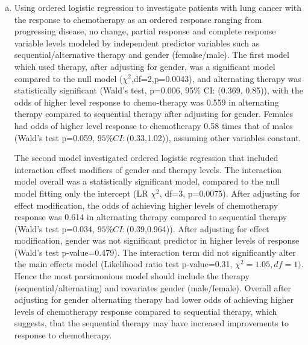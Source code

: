 \documentclass{article}
\begin{document}
\begin{enumerate}[a.]
\item  Using ordered logistic regression to investigate patients with lung cancer  with the response to chemotherapy as an ordered response ranging from progressing disease, no change, partial response and complete response variable levels modeled by independent predictor variables such as sequential/alternative therapy and gender (femalse/male).  The first model which used therapy, after adjusting for gender, was a significant model compared to the null model ($\chi^{2}$,df=2,p=0.0043), and alternating therapy was statistically significant (Wald's test, p=0.006, 95$\%$ CI: (0.369, 0.85)), with the odds of higher level response to chemo-therapy was 0.559 in alternating therapy compared to sequential therapy after adjusting for gender.  Females had odds of higher level response to chemotherapy 0.58 times that of males (Wald's test p=0.059, $95\% CI:$(0.33,1.02)), assuming other variables constant. \par
  The second model investigated ordered logistic regression that included interaction effect modifiers of gender and therapy levels.  The interaction model overall was a statistically significant model, compared to the null model fitting only the intercept (LR $\chi^{2}$, df=3, p=0.0075).  After adjusting for effect modification,  the odds of achieving higher levels of chemotherapy response was 0.614 in alternating therapy compared to sequential therapy (Wald's test p=0.034, $95\% CI:$(0.39,0.964)).  After adjusting for effect modification, gender was not significant predictor in higher levels of response (Wald's test p-value=0.479).  The interaction term did not significantly alter the main effects model (Likelihood ratio test p-value=0.31, $\chi^{2}=1.05, df=1)$.  Hence the most parsimonious model should include the therapy (sequential/alternating) and covariates gender (male/female).   Overall after adjusting for gender alternating therapy had lower odds of achieving higher levels of chemotherapy response compared to sequential therapy, which suggests, that the sequential therapy may have increased improvements to response to chemotherapy.  
\end{enumerate}
\end{document}
